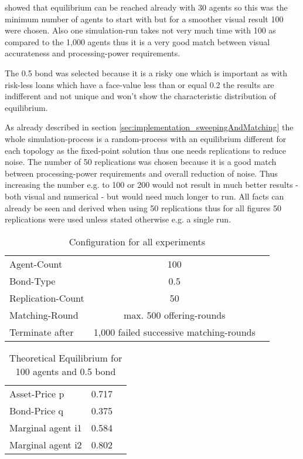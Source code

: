 \documentclass[Bachelorarbeit.tex]{subfiles}
\begin{document}
\bigskip 

\cite{Breuer2015} showed that equilibrium can be reached already with 30 agents so this was the minimum number of agents to start with but for a smoother visual result 100 were chosen. Also one simulation-run takes not very much time with 100 as compared to the 1,000 agents thus it is a very good match between visual accurateness and processing-power requirements.

\medskip

The 0.5 bond was selected because it is a risky one which is important as with risk-less loans which have a face-value less than or equal 0.2 the results are indifferent and not unique and won't show the characteristic distribution of equilibrium.

\medskip

As already described in section \ref{sec:implementation_sweepingAndMatching} the whole simulation-process is a random-process with an equilibrium different for each topology as the fixed-point solution thus one needs replications to reduce noise. The number of 50 replications was chosen because it is a good match between processing-power requirements and overall reduction of noise. Thus increasing the number e.g. to 100 or 200 would not result in much better results - both visual and numerical - but would need much longer to run. All facts can already be seen and derived when using 50 replications thus for all figures 50 replications were used unless stated otherwise e.g. a single run.

\begin{table}[H]
	\centering
	\caption{Configuration for all experiments}
	\begin{tabular} { l c r }
		\hline
		Agent-Count & 100 \\
		Bond-Type & 0.5 \\
		Replication-Count & 50 \\
		Matching-Round & max. 500 offering-rounds \\
		Terminate after & 1,000 failed successive matching-rounds \\
		\hline
	\end{tabular}
\end{table}

\begin{table}[H]
	\centering
	\caption{Theoretical Equilibrium for 100 agents and 0.5 bond}
	\begin{tabular} { l c r }
		\hline
		Asset-Price p & 0.717 \\
		Bond-Price q & 0.375 \\
		Marginal agent i1 & 0.584 \\
		Marginal agent i2 & 0.802 \\
		\hline
	\end{tabular}
	\label{tab:theoretical_equilibrium_100Agents_05Bond}
\end{table}
\end{document}
